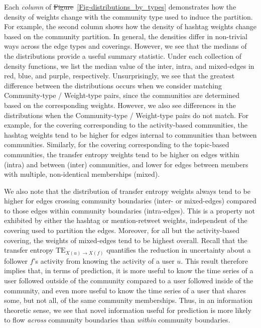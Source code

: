 \documentclass[10pt,letterpaper]{article}
\providecommand{\DIFadd}[1]{{\protect\color{blue}\uwave{#1}}} %
\providecommand{\DIFdel}[1]{{\protect\color{red}\sout{#1}}}                      %
\providecommand{\DIFaddbegin}{} %
\providecommand{\DIFaddend}{} %
\providecommand{\DIFdelbegin}{} %
\providecommand{\DIFdelend}{} %
\begin{document}
Each \emph{column} of \DIFdelbegin \DIFdel{Figure}\DIFdelend \DIFaddbegin \DIFadd{Fig.}\DIFaddend ~\ref{Fig-distributions_by_types} demonstrates how the density of weights change with the community type used to induce the partition. For example, the second column shows how the density of hashtag weights change based on the community partition. In general, the densities differ in non-trivial ways across the edge types and coverings. However, we see that the medians of the distributions provide a useful summary statistic. Under each collection of density functions, we list the median value of the inter, intra, and mixed-edges in red, blue, and purple, respectively. Unsurprisingly, we see that the greatest difference between the distributions occurs when we consider matching Community-type / Weight-type pairs, since the communities are determined based on the corresponding weights. However, we also see differences in the distributions when the Community-type / Weight-type pairs do not match. For example, for the covering corresponding to the activity-based communities, the hashtag weights tend to be higher for edges internal to communities than between communities. Similarly, for the covering corresponding to the topic-based communities, the transfer entropy weights tend to be higher on edges within (intra) and between (inter) communities, and lower for edges between members with multiple, non-identical memberships (mixed).

We also note that the distribution of transfer entropy weights always tend to be higher for edges crossing community boundaries (inter- or mixed-edges) compared to those edges within community boundaries (intra-edges). This is a property not exhibited by either the hashtag or mention-retweet weights, independent of the covering used to partition the edges. Moreover, for all but the activity-based covering, the weights of mixed-edges tend to be highest overall.  Recall that the transfer entropy $\text{TE}_{X(u) \to X(f)}$ quantifies the reduction in uncertainty about a follower $f$'s activity from knowing the activity of a user $u$. This result therefore implies that, in terms of prediction, it is more useful to know the time series of a user followed outside of the community compared to a user followed inside of the community, and even more useful to know the time series of a user that shares some, but not all, of the same community memberships. Thus, in an information theoretic sense, we see that novel information useful for prediction is more likely to flow \emph{across} community boundaries than \emph{within} community boundaries.
\end{document}
